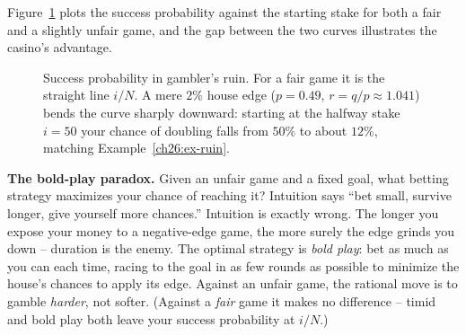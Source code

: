 Figure~\ref{ch26:fig-ruin} plots the success probability against the starting
stake for both a fair and a slightly unfair game, and the gap between the two
curves illustrates the casino's advantage.

\begin{figure}[H]
\centering
{}
\caption{Success probability in gambler's ruin. For a fair game it is the
straight line $i/N$. A mere $2\%$ house edge ($p=0.49$, $r=q/p\approx1.041$)
bends the curve sharply downward: starting at the halfway stake $i=50$ your
chance of doubling falls from $50\%$ to about $12\%$, matching
Example~\ref{ch26:ex-ruin}.}
\label{ch26:fig-ruin}
\end{figure}

\begin{paradoxbox}
\textbf{The bold-play paradox.} Given an unfair game and a fixed goal, what
betting strategy maximizes your chance of reaching it? Intuition says ``bet
small, survive longer, give yourself more chances.'' Intuition is exactly
wrong. The longer you expose your money to a negative-edge game, the more
surely the edge grinds you down -- duration is the enemy. The optimal strategy
is \emph{bold play}: bet as much as you can each time, racing to the goal in as
few rounds as possible to minimize the house's chances to apply its edge.
Against an unfair game, the rational move is to gamble \emph{harder}, not
softer. (Against a \emph{fair} game it makes no difference -- timid and bold play
both leave your success probability at $i/N$.)
\end{paradoxbox}

